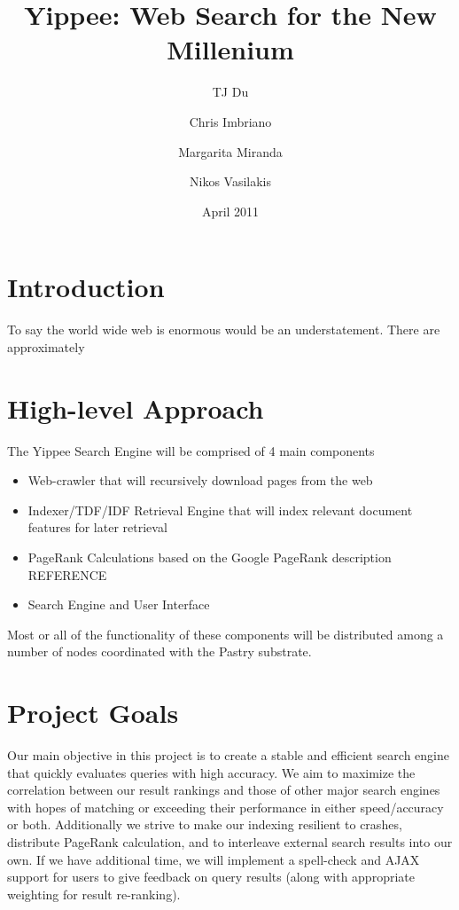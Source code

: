 \documentclass[11pt, twocolumn]{article}
\begin{document}
\title{Yippee: Web Search for the New Millenium}
\author{	TJ Du
	\and Chris Imbriano
	\and Margarita Miranda
	\and Nikos Vasilakis}
\date{April 2011}

\maketitle

\section{ Introduction }

To say the world wide web is enormous would be an understatement.  There are approximately 

\section{ High-level Approach }

The Yippee Search Engine will be comprised of 4 main components
\begin{itemize}
\item Web-crawler that will recursively download pages from the web
\item Indexer/TDF/IDF Retrieval Engine that will index relevant document features for later retrieval 
\item PageRank Calculations based on the Google PageRank description REFERENCE
\item Search Engine and User Interface
\end{itemize}

Most or all of the functionality of these components will be distributed among a number of nodes coordinated with the Pastry substrate.

\section{ Project Goals }

Our main objective in this project is to create a stable and efficient search engine that quickly evaluates queries with high accuracy. We aim to maximize the correlation between our result rankings and those of other major search engines with hopes of matching or exceeding their performance in either speed/accuracy or both. Additionally we strive to make our indexing resilient to crashes, distribute PageRank calculation, and to interleave external search results into our own. If we have additional time, we will implement a spell-check and AJAX support for users to give feedback on query results (along with appropriate weighting for result re-ranking).
\end{document}
